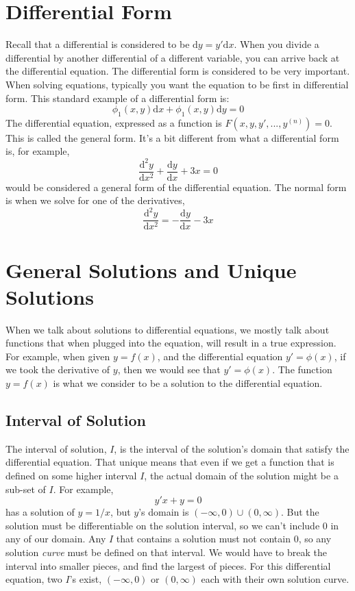 \section{Differential Form}
Recall that a differential is considered to be $\mathrm{d}y=y'\mathrm{d}x$. When you divide a differential by another differential of a different variable, you can arrive back at the differential equation. The differential form is considered to be very important. When solving equations, typically you want the equation to be first in differential form. This standard example of a differential form is:
\begin{equation*}
	\phi_1(x,y)\mathrm{d}x + \phi_1(x,y)\mathrm{d}y = 0
\end{equation*} 
The differential equation, expressed as a function is $F(x,y,y',...,y^{(n)}) = 0$. This is called the general form. It's a bit different from what a differential form is, for example,  
\begin{equation*}
	\frac{\mathrm{d}^2y}{\mathrm{d}x^2} + \frac{\mathrm{d}y}{\mathrm{d}x} + 3x = 0  
\end{equation*}
would be considered a general form of the differential equation. The normal form is when we solve for one of the derivatives, 
\begin{equation*}
	\frac{\mathrm{d}^2y}{\mathrm{d}x^2}  = - \frac{\mathrm{d}y}{\mathrm{d}x} - 3x  
\end{equation*}
\section{General Solutions and Unique Solutions}
When we talk about solutions to differential equations, we mostly talk about functions that when plugged into the equation, will result in a true expression. For example, when given $y=f(x)$, and the differential equation $y'=\phi(x)$, if we took the derivative of $y$, then we would see that $y'=\phi(x)$. The function $y=f(x)$ is what we consider to be a solution to the differential equation. 
\subsection{Interval of Solution}
The interval of solution, $I$, is the interval of the solution's domain that satisfy the differential equation. That unique means that even if we get a function that is defined on some higher interval $I$, the actual domain of the solution might be a sub-set of $I$. For example, 
\begin{equation*}
	y'x + y = 0
\end{equation*}
has a solution of $y=1/x$, but $y$'s domain is $(-\infty, 0) \cup (0,\infty)$. But the solution must be differentiable on the solution interval, so we can't include $0$ in any of our domain. Any $I$ that contains a solution must not contain $0$, so any solution \textit{curve} must be defined on that interval. We would have to break the interval into smaller pieces, and find the largest of pieces. For this differential equation, two $I$'s exist, $(-\infty, 0)$ or $(0,\infty)$ each with their own solution curve.
